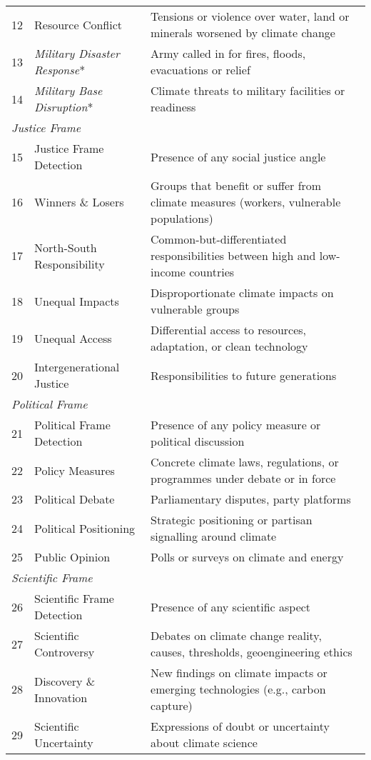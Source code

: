 \documentclass[12pt]{article}
\begin{document}
{\begin{longtable}{p{0.5cm}p{5cm}p{16cm}}
12 & Resource Conflict & Tensions or violence over water, land or minerals worsened by climate change \\
13 & \textit{Military Disaster Response}* & Army called in for fires, floods, evacuations or relief \\
14 & \textit{Military Base Disruption}* & Climate threats to military facilities or readiness \\
\midrule
\multicolumn{3}{l}{\textit{Justice Frame}} \\
15 & Justice Frame Detection & Presence of any social justice angle \\
16 & Winners \& Losers & Groups that benefit or suffer from climate measures (workers, vulnerable populations) \\
17 & North-South Responsibility & Common-but-differentiated responsibilities between high and low-income countries \\
18 & Unequal Impacts & Disproportionate climate impacts on vulnerable groups \\
19 & Unequal Access & Differential access to resources, adaptation, or clean technology \\
20 & Intergenerational Justice & Responsibilities to future generations \\
\midrule
\multicolumn{3}{l}{\textit{Political Frame}} \\
21 & Political Frame Detection & Presence of any policy measure or political discussion \\
22 & Policy Measures & Concrete climate laws, regulations, or programmes under debate or in force \\
23 & Political Debate & Parliamentary disputes, party platforms \\
24 & Political Positioning & Strategic positioning or partisan signalling around climate \\
25 & Public Opinion & Polls or surveys on climate and energy \\
\midrule
\multicolumn{3}{l}{\textit{Scientific Frame}} \\
26 & Scientific Frame Detection & Presence of any scientific aspect \\
27 & Scientific Controversy & Debates on climate change reality, causes, thresholds, geoengineering ethics \\
28 & Discovery \& Innovation & New findings on climate impacts or emerging technologies (e.g., carbon capture) \\
29 & Scientific Uncertainty & Expressions of doubt or uncertainty about climate science \\

\end{longtable}}
\end{document}

